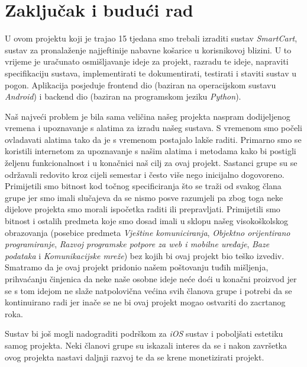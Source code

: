 \chapter{Zaključak i budući rad}
U ovom projektu koji je trajao 15 tjedana smo trebali izraditi sustav \textit{SmartCart}, sustav za pronalaženje najjeftinije nabavne košarice u korisnikovoj blizini. U to vrijeme je uračunato osmišljavanje ideje za projekt, razradu te ideje, napraviti specifikaciju sustava, implementirati te dokumentirati, testirati i staviti sustav u pogon. Aplikacija posjeduje frontend dio (baziran na operacijskom sustavu \textit{Android}) i backend dio (baziran na programskom jeziku \textit{Python}).

Naš najveći problem je bila sama veličina našeg projekta naspram dodijeljenog vremena i upoznavanje s alatima za izradu našeg sustava. S vremenom smo počeli ovladavati alatima tako da je s vremenom postajalo lakše raditi. Primarno smo se koristili internetom za upoznavanje s našim alatima i metodama kako bi postigli željenu funkcionalnost i u konačnici naš cilj za ovaj projekt. Sastanci grupe su se održavali redovito kroz cijeli semestar i često više nego inicijalno dogovoreno. Primijetili smo bitnost kod točnog specificiranja što se traži od svakog člana grupe jer smo imali slučajeva da se nismo posve razumjeli pa zbog toga neke dijelove projekta smo morali ispočetka raditi ili prepravljati. Primijetili smo bitnost i ostalih predmeta koje smo dosad imali u sklopu našeg visokoškolskog obrazovanja (posebice predmeta \textit{Vještine komuniciranja}, \textit{Objektno orijentirano programiranje}, \textit{Razvoj programske potpore za web i mobilne uređaje}, \textit{Baze podataka} i \textit{Komunikacijske mreže}) bez kojih bi ovaj projekt bio teško izvediv. Smatramo da je ovaj projekt pridonio našem poštovanju tuđih mišljenja, prihvaćanju činjenica da neke naše osobne ideje neće doći u konačni proizvod jer se s tom idejom ne slaže natpolovična većina svih članova grupe i potrebi da se kontinuirano radi jer inače se ne bi ovaj projekt mogao ostvariti do zacrtanog roka.

Sustav bi još mogli nadograditi podrškom za \textit{iOS} sustav i poboljšati estetiku samog projekta. Neki članovi grupe su iskazali interes da se i nakon završetka ovog projekta nastavi daljnji razvoj te da se krene monetizirati projekt.   
\eject